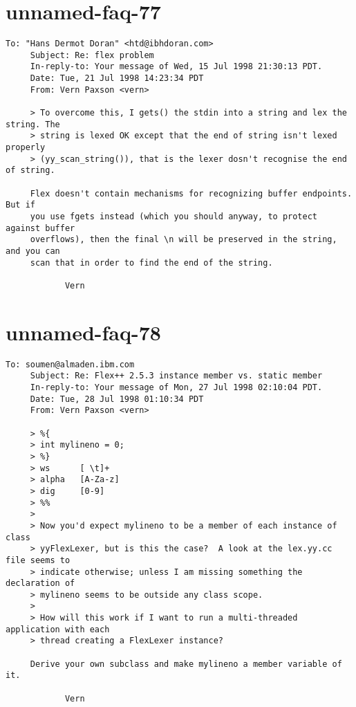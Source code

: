 \documentclass[openany,oneside]{book}
\begin{document}
\section{unnamed-faq-77}

\begin{verbatim}
To: "Hans Dermot Doran" <htd@ibhdoran.com>
     Subject: Re: flex problem
     In-reply-to: Your message of Wed, 15 Jul 1998 21:30:13 PDT.
     Date: Tue, 21 Jul 1998 14:23:34 PDT
     From: Vern Paxson <vern>
     
     > To overcome this, I gets() the stdin into a string and lex the string. The
     > string is lexed OK except that the end of string isn't lexed properly
     > (yy_scan_string()), that is the lexer dosn't recognise the end of string.
     
     Flex doesn't contain mechanisms for recognizing buffer endpoints.  But if
     you use fgets instead (which you should anyway, to protect against buffer
     overflows), then the final \n will be preserved in the string, and you can
     scan that in order to find the end of the string.
     
     		Vern
\end{verbatim}

\section{unnamed-faq-78}

\begin{verbatim}
To: soumen@almaden.ibm.com
     Subject: Re: Flex++ 2.5.3 instance member vs. static member
     In-reply-to: Your message of Mon, 27 Jul 1998 02:10:04 PDT.
     Date: Tue, 28 Jul 1998 01:10:34 PDT
     From: Vern Paxson <vern>
     
     > %{
     > int mylineno = 0;
     > %}
     > ws      [ \t]+
     > alpha   [A-Za-z]
     > dig     [0-9]
     > %%
     >
     > Now you'd expect mylineno to be a member of each instance of class
     > yyFlexLexer, but is this the case?  A look at the lex.yy.cc file seems to
     > indicate otherwise; unless I am missing something the declaration of
     > mylineno seems to be outside any class scope.
     >
     > How will this work if I want to run a multi-threaded application with each
     > thread creating a FlexLexer instance?
     
     Derive your own subclass and make mylineno a member variable of it.
     
     		Vern
\end{verbatim}
\end{document}
